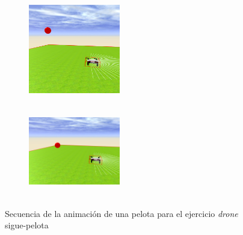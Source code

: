 \begin{figure}[H]
\begin{subfigure}[t]{0.3\textwidth}
\label{fig:figure2_6}
\end{subfigure}\hfill
\begin{subfigure}[t]{0.3\textwidth}
    \includegraphics[width=4cm, height=4cm]{img/followBallTello7.png}
\label{fig:figure2_7}
\end{subfigure}\hfill
\begin{subfigure}[t]{0.3\textwidth}
    \includegraphics[width=4cm, height=4cm]{img/followBallTello8.png}
\label{fig:figure2_8}
\end{subfigure}

\caption{Secuencia de la animación de una pelota para el ejercicio \textit{drone} sigue-pelota}
\label{fig:secuenciaDrone}
\end{figure}

